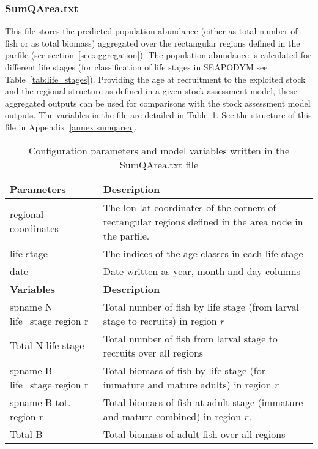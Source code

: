 \subsubsection{{\ttfamily SumQArea.txt}}
\label{sec:SumQArea}
This file stores the predicted population abundance (either as total number of fish or as total biomass) aggregated over the rectangular regions defined in the parfile (see section~\ref{sec:aggregation}). The population abundance is calculated for different life stages (for classification of life stages in SEAPODYM see Table~\ref{tab:life_stages}). Providing the age at recruitment to the exploited stock and the regional structure as defined in a given stock assessment model, these aggregated outputs can be used for comparisons with the stock assessment model outputs. The variables in the file are detailed in Table~\ref{tab:variables-sumqarea}. See the structure of this file in Appendix~\ref{annex:sumqarea}. \\
 
\begin{table}[H]
\caption{Configuration parameters and model variables written in the {\ttfamily SumQArea.txt} file}
\raggedleft
\begin{tabular}{p{4cm}p{11.75cm}}
    {\bfseries Parameters} &  {\bfseries Description}\\ \hline \hline
    {\ttfamily regional coordinates} & The lon-lat coordinates of the corners of rectangular regions defined in the {\ttfamily area} node in the parfile. \\ 
    \hline
    {\ttfamily life stage} & The indices of the age classes in each life stage\\
    \hline
     {\ttfamily date} & Date written as {\ttfamily year}, {\ttfamily month} and {\ttfamily day} columns \\\hline 
    {\bfseries Variables} &  {\bfseries Description}\\ \hline \hline
    {\ttfamily spname N} {\ttfamily life\_stage} {\ttfamily region r}  & Total number of fish by life stage (from larval stage to recruits) in region $r$ \\ 
    \hline
    {\ttfamily Total N} {\ttfamily life stage}  & Total number of fish from larval stage to recruits over all regions\\ \hline
    {\ttfamily spname B} {\ttfamily life\_stage} {\ttfamily region r}  & Total biomass of fish by life stage (for immature and mature adults) in region $r$ \\ 
    \hline
    {\ttfamily spname B tot.} {\ttfamily region r}  & Total biomass of fish at adult stage (immature and mature combined) in region $r$.\\ 
    \hline
    {\ttfamily Total B}  & Total biomass of adult fish over all regions\\
    \hline
\end{tabular}
\label{tab:variables-sumqarea}
\end{table}

